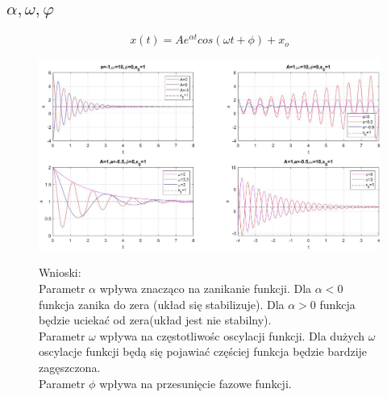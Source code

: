 \documentclass{article}
\begin{document}
\subsection{$\alpha,\omega,\varphi$}
$$
x(t)=Ae^{\alpha t}cos(\omega t + \phi)+x_o
$$
\begin{figure}[h!]
    \begin{flushleft}
    
    \includegraphics[scale=0.52]{b_wykresy_wersja2.png}
    \end{flushleft}
    \label{fig:my_label}
    
\end{figure}
\begin{flushleft}
\begin{figure}[h!]
Wnioski:\\
Parametr $\alpha$ wpływa znacząco na zanikanie funkcji. Dla $\alpha < 0$ funkcja zanika do zera (układ się stabilizuje). Dla $\alpha > 0$ funkcja będzie uciekać od zera(układ jest nie stabilny).\\
Parametr $\omega$ wpływa na częstotliwośc oscylacji funkcji. Dla dużych $\omega$ oscylacje funkcji będą się pojawiać częściej funkcja będzie bardzije zagęszczona. \\
Parametr $\phi$ wpływa na przesunięcie fazowe funkcji. \\
\end{figure}
\end{flushleft}



\newpage
\end{document}
